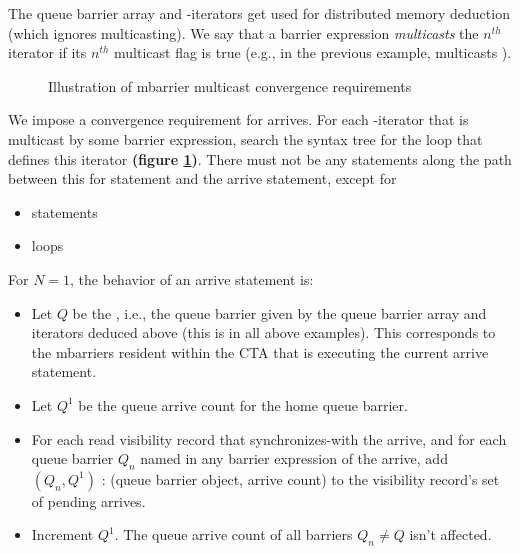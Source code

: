 The queue barrier array and -iterators get used for distributed memory deduction (which ignores multicasting).
We say that a barrier expression \textit{multicasts} the $n^{th}$ iterator if its $n^{th}$ multicast flag is true (e.g., in the previous example,  multicasts ).

\begin{figure}[!b]

\caption{Illustration of mbarrier multicast convergence requirements} \label{fig:multicast_convergence}
\end{figure}

\filbreak
{}

We impose a convergence requirement for arrives.
For each -iterator that is multicast by some barrier expression, search the syntax tree for the  loop that defines this iterator \textbf{(figure \ref{fig:multicast_convergence})}.
There must not be any statements along the path between this for statement and the arrive statement, except for
\begin{itemize}
  \item {} statements
  \filbreak
  \item {} loops
\end{itemize}

\filbreak
For $N=1$, the behavior of an arrive statement is:
\begin{itemize}
  \item Let $Q$ be the , i.e., the queue barrier given by the queue barrier array and iterators deduced above (this is  in all above examples).
    This corresponds to the mbarriers resident within the CTA that is executing the current arrive statement.
  \filbreak
  \item Let $Q^1$ be the queue arrive count for the home queue barrier.
  \filbreak
  \item For each read visibility record that synchronizes-with the arrive, and for each queue barrier $Q_n$ named in any barrier expression of the arrive, add $(Q_n, Q^1)$ : (queue barrier object, arrive count) to the visibility record's set of pending arrives.
  \filbreak
  \item Increment $Q^1$.
    The queue arrive count of all barriers $Q_n \ne Q$ isn't affected.
\end{itemize}

